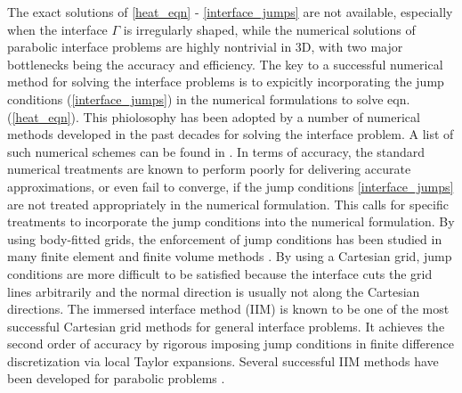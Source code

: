 \documentclass[dissertation]{uathesis}
\begin{document}
\begin{body}
\begin{flushleft}
\hspace{1cm} The exact solutions of \eqref{heat_eqn} - \eqref{interface_jumps} are not available, especially when the interface $\Gamma$ is irregularly shaped, while the numerical solutions of parabolic interface problems are highly nontrivial in 3D, with two major bottlenecks being the accuracy and efficiency. The key to a successful numerical method for solving the interface problems is to expicitly incorporating the jump conditions (\ref{interface_jumps}) in the numerical formulations to solve eqn. (\ref{heat_eqn}). This phiolosophy has been adopted by a number of numerical methods developed in the past decades for solving the interface problem. A list of such numerical schemes can be found in \cite{li2017matched}. In terms of accuracy, the standard numerical treatments are known to perform poorly for delivering accurate approximations, or even fail to converge, if the jump conditions \eqref{interface_jumps} are not treated appropriately in the numerical formulation. 
This calls for specific treatments to incorporate the jump conditions into the numerical formulation.
By using body-fitted grids, the enforcement of jump conditions has been studied 
in many finite element and finite volume methods \cite{attanayake2011convergence, chen1998finite, sinha2005optimal, sinha2009finite, wang2010embedded}. 
By using a Cartesian grid,  jump conditions  are more difficult to be satisfied because the interface cuts the grid lines arbitrarily and the normal direction is usually not along the Cartesian directions. 
The immersed interface method (IIM) \cite{leveque1994immersed} is known to be one of the most successful Cartesian grid methods for general interface problems. It achieves the second order of accuracy by rigorous imposing jump conditions in finite difference discretization via local Taylor expansions.
Several successful IIM methods have been developed for parabolic  problems
\cite{adams2002immersed, bouchon2010immersed, bouchon2010immersed2, kandilarov2004immersed, kandilarov2007immersed}. 


\end{flushleft}
\end{body}
\end{document}
